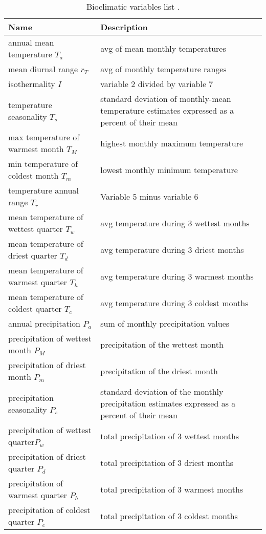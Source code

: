 \documentclass[letterpaper, 12pt]{article}
\theoremstyle{theo}
\begin{document}
\begin{refsection}
\begin{onehalfspace}
\begin{table}[h!]
\centering
\caption{Bioclimatic variables list \citep{McKenney2011}. \label{tab::bioclim}}
\begin{tabular}{p{6.75cm}p{9cm}}
	\toprule
	\textbf{Name} & \textbf{Description} \\
	\midrule
	annual mean temperature $ T_a $ & avg of mean monthly temperatures \\
	mean diurnal range $ r_T $ & avg of monthly temperature ranges \\
	isothermality $ I $ & variable 2 divided by variable 7 \\
	temperature seasonality $ T_s $ & standard deviation of monthly-mean temperature estimates expressed as a percent of their mean \\
	max temperature of warmest month $ T_M $ & highest monthly maximum temperature \\
	min temperature of coldest month $ T_m $ & lowest monthly minimum temperature \\
	temperature annual range $ T_r $ & Variable 5 minus variable 6 \\
	mean temperature of wettest quarter $ T_w $ & avg temperature during 3 wettest months \\
	mean temperature of driest quarter $ T_d $ & avg temperature during 3 driest months \\
	mean temperature of warmest quarter $ T_h $ & avg temperature during 3 warmest months \\
	mean temperature of coldest quarter $ T_c $ & avg temperature during 3 coldest months \\
	annual precipitation $ P_a $ & sum of monthly precipitation values \\
	precipitation of wettest month $ P_M $ & precipitation of the wettest month \\
	precipitation of driest month $ P_m $ & precipitation of the driest month \\
	precipitation seasonality $ P_s $ & standard deviation of the monthly precipitation estimates expressed as a percent of their mean \\
	precipitation of wettest quarter$ P_w $  & total precipitation of 3 wettest months \\
	precipitation of driest quarter $ P_d $ & total precipitation of 3 driest months \\
	precipitation of warmest quarter $ P_h $ & total precipitation of 3 warmest months \\
	precipitation of coldest quarter $ P_c $ & total precipitation of 3 coldest months \\
	\bottomrule
\end{tabular}
\end{table}


\end{onehalfspace}
\end{refsection}
\end{document}
